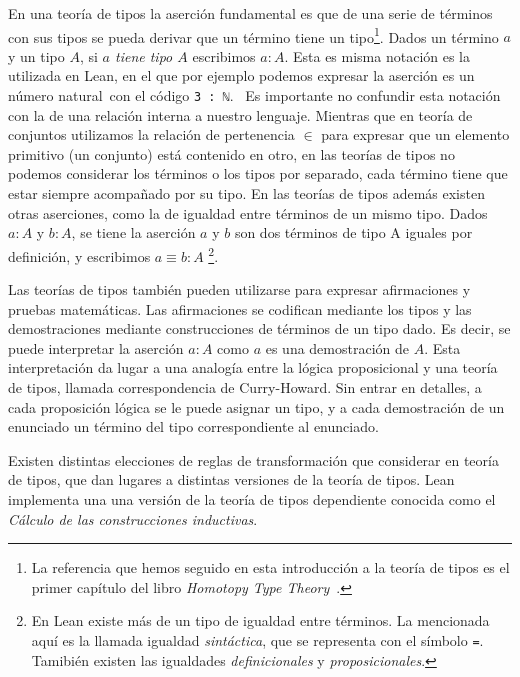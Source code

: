 En una teoría de tipos la aserción fundamental es \guillemotleft que de una serie de
términos con sus tipos se pueda derivar que un término tiene un
tipo\guillemotright\footnote{La referencia que hemos seguido en esta introducción a la teoría
	de tipos es el primer capítulo del libro \textit{Homotopy Type
		Theory}~\cite{HomotopyTypeTheory}.}. Dados un término $a$ y un tipo $A$, si
\textit{$a$ tiene tipo $A$} escribimos $a:A$. Esta es misma notación es la
utilizada en Lean, en el que por ejemplo podemos expresar la aserción
 es un número natural\guillemotright\ con el código \lstinline{3 : ℕ}.
\
Es importante no confundir esta notación con la de una relación interna a
nuestro lenguaje. Mientras que en teoría de conjuntos utilizamos la relación de
pertenencia $\in$ para expresar que un elemento primitivo (un conjunto) está
contenido en otro, en las teorías de tipos no podemos considerar los términos o
los tipos por separado, cada término tiene que estar siempre acompañado por su
tipo. En las teorías de tipos además existen otras aserciones, como la de
igualdad entre términos de un mismo tipo. Dados $a:A$ y $b:A$, se tiene la
aserción \guillemotleft $a$ y $b$ son dos términos de tipo A iguales por
definición\guillemotright, y escribimos $a\equiv b : A$ \footnote{En
	Lean existe más de un tipo de igualdad entre términos. La mencionada
	aquí es la llamada igualdad \textit{sintáctica}, que se representa con el
	símbolo \lstinline{=}. Tamibién existen las igualdades \textit{definicionales} y
\textit{proposicionales}.}.

Las teorías de tipos también pueden utilizarse para expresar afirmaciones y
pruebas matemáticas. Las afirmaciones se codifican mediante los tipos y
las demostraciones mediante construcciones de términos de un tipo dado. Es
decir, se puede interpretar la aserción $a : A$ como \guillemotleft$a$ es una
demostración de $A$\guillemotright. Esta interpretación da lugar a una analogía
entre la lógica proposicional y una teoría de tipos, llamada correspondencia de
Curry-Howard. Sin entrar en detalles, a cada proposición lógica se le puede
asignar un tipo, y a cada demostración de un enunciado un término del tipo
correspondiente al enunciado.

Existen distintas elecciones de reglas de transformación que considerar en
teoría de tipos, que dan lugares a distintas versiones de la teoría de tipos.
Lean implementa una una versión de la teoría de tipos dependiente conocida como
el \textit{Cálculo de las construcciones inductivas}.

